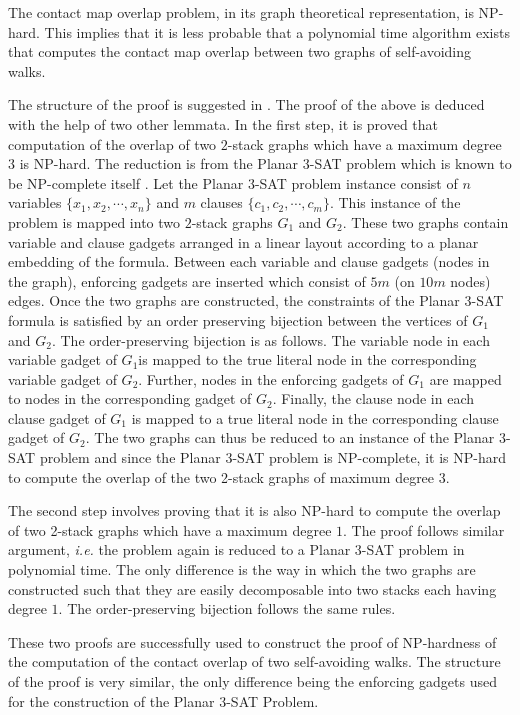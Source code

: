 The contact map overlap problem, in its graph theoretical representation, is NP-hard. This implies that it is less probable that a polynomial time algorithm exists that computes the contact map overlap between two graphs of self-avoiding walks.

The structure of the proof is suggested in \citet{goip99}. The proof of the above is deduced with the help of two other lemmata. In the first step, it is proved that computation of the overlap of two $2$-stack graphs which have a maximum degree $3$ is NP-hard. The reduction is from the Planar $3$-SAT problem which is known to be NP-complete itself \citep{lich82}. Let the Planar $3$-SAT problem instance consist of $n$ variables $\{x_1,x_2,\cdots,x_n\}$ and $m$ clauses $\{c_1,c_2,\cdots,c_m\}$. This instance of the problem is mapped into two $2$-stack graphs $G_1$ and $G_2$. These two graphs contain variable and clause gadgets arranged in a linear layout according to a planar embedding of the formula. Between each variable and clause gadgets (nodes in the graph), enforcing gadgets are inserted which consist of $5m$ (on $10m$ nodes) edges. Once the two graphs are constructed, the constraints of the Planar $3$-SAT formula is satisfied by an order preserving bijection between the vertices of $G_1$ and $G_2$. The order-preserving bijection is as follows. The variable node in each variable gadget of $G_1$is mapped to the true literal node in the corresponding variable gadget of $G_2$. Further, nodes in the enforcing gadgets of $G_1$ are mapped to nodes in the corresponding gadget of $G_2$. Finally, the clause node in each clause gadget of $G_1$ is mapped to a true literal node in the corresponding clause gadget of $G_2$. The two graphs can thus be reduced to an instance of the Planar $3$-SAT problem and since the Planar $3$-SAT problem is NP-complete, it is NP-hard to compute the overlap of the two 2-stack graphs of maximum degree $3$.

The second step involves proving that it is also NP-hard to compute the overlap of two 2-stack graphs which have a maximum degree $1$. The proof follows similar argument, \emph{i.e.} the problem again is reduced to a Planar $3$-SAT problem in polynomial time. The only difference is the way in which the two graphs are constructed such that they are easily decomposable into two stacks each having degree $1$. The order-preserving bijection follows the same rules.

These two proofs are successfully used to construct the proof of NP-hardness of the computation of the contact overlap of two self-avoiding walks. The structure of the proof is very similar, the only difference being the enforcing gadgets used for the construction of the Planar $3$-SAT Problem. 